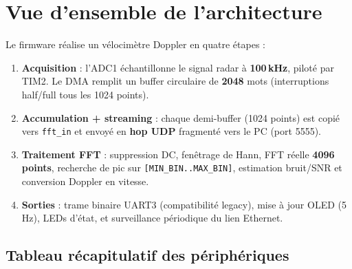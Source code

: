 \documentclass[a4paper,11pt]{article}
\begin{document}
\section{Vue d'ensemble de l'architecture}

Le firmware r\'ealise un v\'elocim\`etre Doppler en quatre \'etapes :

\begin{enumerate}[leftmargin=2em]
  \item \textbf{Acquisition} : l'ADC1 \'echantillonne le signal radar \`a \textbf{100\,kHz}, pilot\'e par TIM2. Le DMA remplit un buffer circulaire de \textbf{2048} mots (interruptions half/full tous les 1024 points).
  \item \textbf{Accumulation + streaming} : chaque demi-buffer (1024 points) est copi\'e vers \texttt{fft\_in} et envoy\'e en \textbf{hop UDP} fragment\'e vers le PC (port 5555).
  \item \textbf{Traitement FFT} : suppression DC, fen\^etrage de Hann, FFT r\'eelle \textbf{4096 points}, recherche de pic sur \texttt{[MIN\_BIN..MAX\_BIN]}, estimation bruit/SNR et conversion Doppler en vitesse.
  \item \textbf{Sorties} : trame binaire UART3 (compatibilit\'e legacy), mise \`a jour OLED (5 Hz), LEDs d'\'etat, et surveillance p\'eriodique du lien Ethernet.
\end{enumerate}

\subsection{Tableau r\'ecapitulatif des p\'eriph\'eriques}
\end{document}
